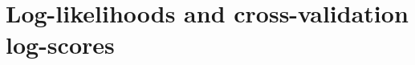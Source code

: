 \documentclass[\ifafour a4paper,12pt,\else a5paper,10pt,\fi%
onecolumn,oneside,article,%
british%
]{memoir}
\title{\propertitle}
\author{%
\hspace*{\stretch{1}}%
\parbox{0.75\linewidth}%
{\protect\centering P.G.L.  Porta Mana\\%
\footnotesize Kavli Institute, Trondheim, Norway \quad\epost{\email{piero.mana}{ntnu.no}}}%
\hspace*{\stretch{1}}%
}
\date{\firstpublished; updated \updated}
\theoremstyle{remark}
\theoremstyle{innote}
\newcommand*{\amp}{\&}
\newcommand*{\asudedication}[1]{%
{\par\centering\textit{#1}\par}}
\renewcommand*{\|}[1][]{\nonscript\,#1\vert\nonscript\;\mathopen{}}
\begin{document}
\captiondelim{\quad}\captionnamefont{\footnotesize}\captiontitlefont{\footnotesize}
\frenchspacing
\maketitle

\abstractrunin
\abslabeldelim{}
\renewcommand*{\abstractname}{}
\setlength{\absleftindent}{0pt}
\setlength{\absrightindent}{0pt}
\setlength{\abstitleskip}{-\absparindent}
\begin{abstract}%
  \noindent It is shown that the log-likelihood of a hypothesis or model
  given some data is equivalent to an average of all leave-one-out
  cross-validation log-scores that can be calculated from all subsets of
  the data. This relation can be generalized to any $k$-fold
  cross-validation log-scores.
\\\noindent\emph{\footnotesize Note: Dear Reader
    \amp\ Peer, this manuscript is being peer-reviewed by you. Thank you.}
\end{abstract}
\frenchspacing





\section{Log-likelihoods and cross-validation log-scores}
\label{sec:intro}
\end{document}
